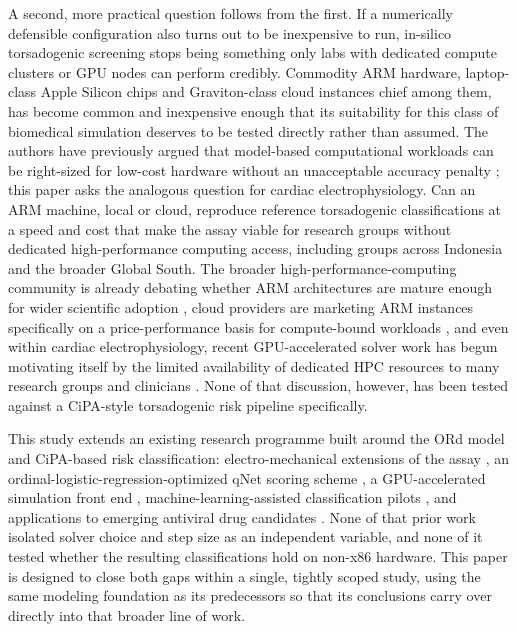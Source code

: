\documentclass[journal]{IEEEtran}
\begin{document}
A second, more practical question follows from the first. If a numerically defensible configuration also turns out to be inexpensive to run, in-silico torsadogenic screening stops being something only labs with dedicated compute clusters or GPU nodes can perform credibly. Commodity ARM hardware, laptop-class Apple Silicon chips and Graviton-class cloud instances chief among them, has become common and inexpensive enough that its suitability for this class of biomedical simulation deserves to be tested directly rather than assumed. The authors have previously argued that model-based computational workloads can be right-sized for low-cost hardware without an unacceptable accuracy penalty \cite{pramawijaya2022}; this paper asks the analogous question for cardiac electrophysiology. Can an ARM machine, local or cloud, reproduce reference torsadogenic classifications at a speed and cost that make the assay viable for research groups without dedicated high-performance computing access, including groups across Indonesia and the broader Global South. The broader high-performance-computing community is already debating whether ARM architectures are mature enough for wider scientific adoption \cite{armhpc2023}, cloud providers are marketing ARM instances specifically on a price-performance basis for compute-bound workloads \cite{awsgraviton}, and even within cardiac electrophysiology, recent GPU-accelerated solver work has begun motivating itself by the limited availability of dedicated HPC resources to many research groups and clinicians \cite{torchcor2025}. None of that discussion, however, has been tested against a CiPA-style torsadogenic risk pipeline specifically.

This study extends an existing research programme built around the ORd model and CiPA-based risk classification: electro-mechanical extensions of the assay \cite{heikhmakhtiar2026}, an ordinal-logistic-regression-optimized qNet scoring scheme \cite{kamanditya2024}, a GPU-accelerated simulation front end \cite{aroli2024}, machine-learning-assisted classification pilots \cite{fuadah2024}, and applications to emerging antiviral drug candidates \cite{qauli2025}. None of that prior work isolated solver choice and step size as an independent variable, and none of it tested whether the resulting classifications hold on non-x86 hardware. This paper is designed to close both gaps within a single, tightly scoped study, using the same modeling foundation as its predecessors so that its conclusions carry over directly into that broader line of work.
\end{document}
